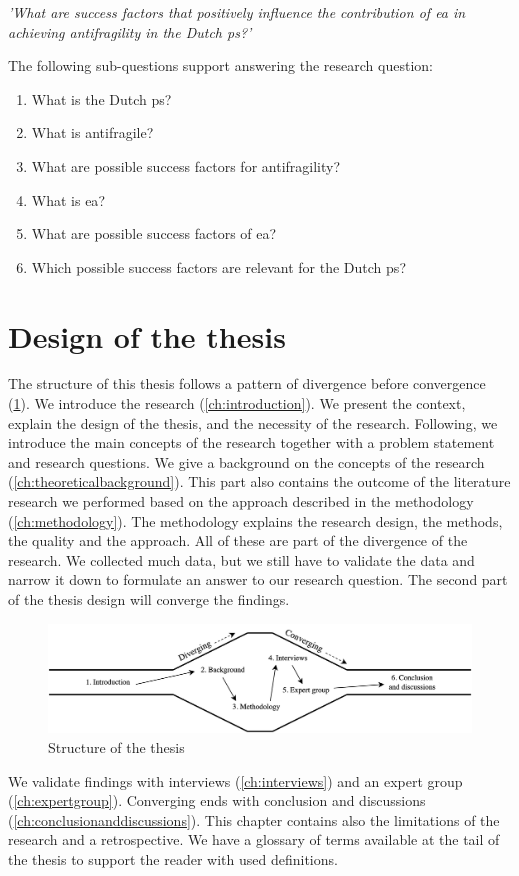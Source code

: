 \vspace{\baselineskip}
\noindent \emph{'What are success factors that positively influence the contribution of \acrlong{ea} in achieving \gls{antifragility} in the Dutch \gls{ps}?'}
\vspace{\baselineskip}

\noindent The following sub-questions support answering the research question:
\begin{enumerate}
	\item{What is the Dutch \gls{ps}?}
	\item{What is \gls{antifragile}?}
	\item{What are possible success factors for \gls{antifragility}?}
	\item{What is \acrlong{ea}?}
	\item{What are possible success factors of \acrlong{ea}?}
	\item{Which possible success factors are relevant for the Dutch \gls{ps}?}
\end{enumerate}

\section{Design of the thesis}
\label{sec:structure}
The structure of this thesis follows a pattern of divergence before convergence (\cref{fig:design}). We introduce the research (\cref{ch:introduction}). We present the context, explain the design of the thesis, and the necessity of the research. Following, we introduce the main concepts of the research together with a problem statement and research questions. We give a background on the concepts of the research (\cref{ch:theoreticalbackground}). This part also contains the outcome of the literature research we performed based on the approach described in the methodology (\cref{ch:methodology}). The methodology explains the research design, the methods, the quality and the approach. All of these are part of the divergence of the research. We collected much data, but we still have to validate the data and narrow it down to formulate an answer to our research question. The second part of the thesis design will converge the findings.
\begin{figure}[H]
	\centering
	\includegraphics[width=0.9\linewidth]{images/structure}
	\caption[Design of the thesis]{Structure of the thesis}
	\label{fig:design}
\end{figure}
We validate findings with interviews (\cref{ch:interviews}) and an expert group (\cref{ch:expertgroup}). Converging ends with  conclusion and discussions (\cref{ch:conclusionanddiscussions}). This chapter contains also the limitations of the research and a retrospective. We have a glossary of terms available at the tail of the thesis to support the reader with used definitions.
